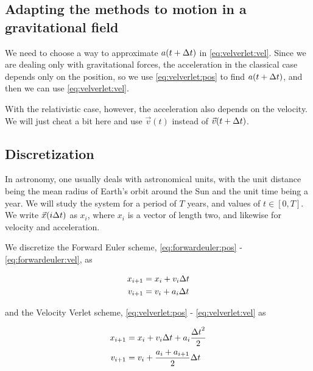 \documentclass[a4paper]{article}
\begin{document}
\subsection{Adapting the methods to motion in a gravitational field}

We need to choose a way to approximate $a(t + {\Delta t})$ in \eqref{eq:velverlet:vel}. Since we are dealing only with gravitational forces, the acceleration in the classical case depends only on the position, so we use \eqref{eq:velverlet:pos} to find $a(t + {\Delta t})$, and then we can use \eqref{eq:velverlet:vel}.

With the relativistic case, however, the acceleration also depends on the velocity. We will just cheat a bit here and use $\vec{v}(t)$ instead of $\vec{v}(t + {\Delta t})$.


\subsection{Discretization}
In astronomy, one usually deals with astronomical units, with the unit distance being the mean radius of Earth's orbit around the Sun and the unit time being a year. We will study the system for a period of $T$ years, and values of $t \in [0, T]$. We write $\vec{x}(i {\Delta t})$ as $x_i$, where $x_i$ is a vector of length two, and likewise for velocity and acceleration.

We discretize the Forward Euler scheme, \eqref{eq:forwardeuler:pos} - \eqref{eq:forwardeuler:vel}, as

\begin{align}
    x_{i+1} &= x_{i} + v_{i}{\Delta t} \\
    v_{i+1} &= v_{i} + a_{i}{\Delta t}
\end{align}

and the Velocity Verlet scheme, \eqref{eq:velverlet:pos} - \eqref{eq:velverlet:vel} as

\begin{align}
    x_{i+1} &= x_{i} + v_{i}{\Delta t} + a_{i} \frac{{\Delta t}^2}{2} \\
    v_{i+1} &= v_{i} + \frac{a_{i} + a_{i+1}}{2}{\Delta t}
\end{align}


\end{document}
